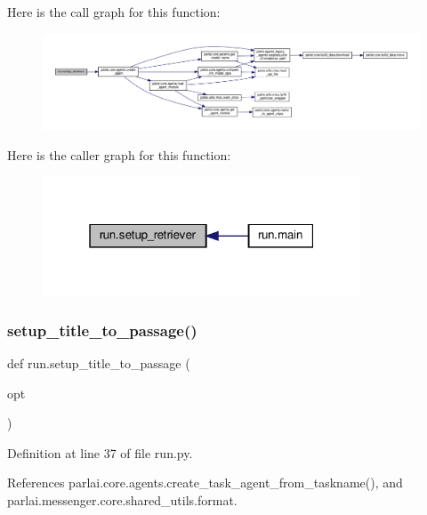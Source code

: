 Here is the call graph for this function\+:
\nopagebreak
\begin{figure}[H]
\begin{center}
\leavevmode
\includegraphics[width=350pt]{namespacerun_af213d4a09b8048dcf1e76b0cb75dcace_cgraph}
\end{center}
\end{figure}
Here is the caller graph for this function\+:
\nopagebreak
\begin{figure}[H]
\begin{center}
\leavevmode
\includegraphics[width=268pt]{namespacerun_af213d4a09b8048dcf1e76b0cb75dcace_icgraph}
\end{center}
\end{figure}
\mbox{\label{namespacerun_a8c0e38f5a5957dd35a11cc5d806887fd}} 
\subsubsection{\texorpdfstring{setup\+\_\+title\+\_\+to\+\_\+passage()}{setup\_title\_to\_passage()}}
{\footnotesize\ttfamily def run.\+setup\+\_\+title\+\_\+to\+\_\+passage (\begin{DoxyParamCaption}\item[{}]{opt }\end{DoxyParamCaption})}



Definition at line 37 of file run.\+py.



References parlai.\+core.\+agents.\+create\+\_\+task\+\_\+agent\+\_\+from\+\_\+taskname(), and parlai.\+messenger.\+core.\+shared\+\_\+utils.\+format.



